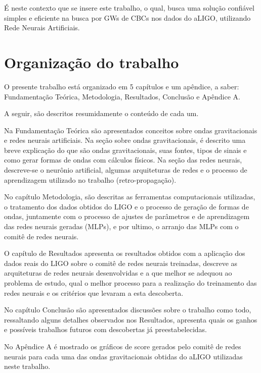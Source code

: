 É neste contexto que se insere este trabalho, o qual, busca uma solução confiável simples e eficiente na busca por GWs de CBCs nos dados do aLIGO, utilizando Rede Neurais Artificiais.

\section{Organização do trabalho}

O presente trabalho está organizado em 5 capítulos e um apêndice, a saber: Fundamentação Teórica, Metodologia, Resultados, Conclusão e Apêndice A. 

A seguir, são descritos resumidamente o conteúdo de cada um.

Na Fundamentação Teórica são apresentados conceitos sobre ondas gravitacionais e redes neurais artificiais. Na seção sobre ondas gravitacionais, é descrito uma breve explicação do que são ondas gravitacionais, suas fontes, tipos de sinais e como gerar formas de ondas com cálculos físicos. Na seção das redes neurais, descreve-se o neurônio artificial, algumas arquiteturas de redes e o processo de aprendizagem utilizado no trabalho (retro-propagação). 

No capítulo Metodologia, são descritas as ferramentas computacionais utilizadas, o tratamento dos dados obtidos do LIGO e o processo de geração de formas de ondas, juntamente com o processo de ajustes de parâmetros e de aprendizagem das redes neurais geradas (MLPs), e por ultimo, o arranjo das MLPs com o comitê de redes neurais.

O capítulo de Resultados apresenta os resultados obtidos com a aplicação dos dados reais do LIGO sobre o comitê de redes neurais treinadas, descreve as arquiteturas de redes neurais desenvolvidas e a que melhor se adequou ao problema de estudo, qual o melhor processo para a realização do treinamento das redes neurais e os critérios que levaram a esta descoberta.

No capítulo Conclusão são apresentados discussões sobre o trabalho como todo, ressaltando alguns detalhes observados nos Resultados, apresenta quais os ganhos e possíveis trabalhos futuros com descobertas já preestabelecidas.

No Apêndice A é mostrado os gráficos de score gerados pelo comitê de redes neurais para cada uma das ondas gravitacionais obtidas do aLIGO utilizadas neste trabalho.